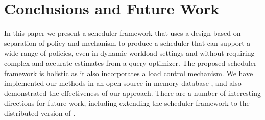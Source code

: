 \section{Conclusions and Future Work}\label{sec:conclusion}
In this paper we present a scheduler framework that uses a design based on separation of policy and mechanism to produce a scheduler that can support a wide-range of policies, even in dynamic workload settings and without requiring complex and accurate estimates from a query optimizer. The proposed scheduler framework is holistic as it also incorporates a load control mechanism. We have implemented our methods in an open-source in-memory database \sys{}, and also demonstrated the effectiveness of our approach.
There are a number of interesting directions for future work, including extending the scheduler framework to the distributed version of \sys{}. %